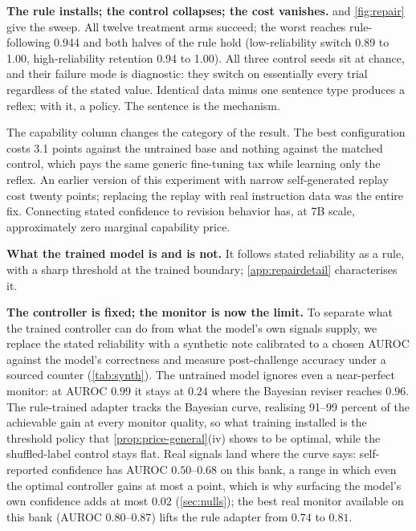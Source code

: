 \documentclass{article}
\begin{document}
\textbf{The rule installs; the control collapses; the cost vanishes.}  and \cref{fig:repair} give the sweep. All twelve treatment arms succeed; the worst reaches rule-following 0.944 and both halves of the rule hold (low-reliability switch 0.89 to 1.00, high-reliability retention 0.94 to 1.00). All three control seeds sit at chance, and their failure mode is diagnostic: they switch on essentially every trial regardless of the stated value. Identical data minus one sentence type produces a reflex; with it, a policy. The sentence is the mechanism.

The capability column changes the category of the result. The best configuration costs 3.1 points against the untrained base and nothing against the matched control, which pays the same generic fine-tuning tax while learning only the reflex. An earlier version of this experiment with narrow self-generated replay cost twenty points; replacing the replay with real instruction data was the entire fix. Connecting stated confidence to revision behavior has, at 7B scale, approximately zero marginal capability price.

\textbf{What the trained model is and is not.} It follows stated reliability as a rule, with a sharp threshold at the trained boundary; \cref{app:repairdetail} characterises it.




\textbf{The controller is fixed; the monitor is now the limit.} To separate what the trained controller can do from what the model's own signals supply, we replace the stated reliability with a synthetic note calibrated to a chosen AUROC against the model's correctness and measure post-challenge accuracy under a sourced counter (\cref{tab:synth}). The untrained model ignores even a near-perfect monitor: at AUROC $0.99$ it stays at $0.24$ where the Bayesian reviser reaches $0.96$. The rule-trained adapter tracks the Bayesian curve, realising 91--99 percent of the achievable gain at every monitor quality, so what training installed is the threshold policy that \cref{prop:price-general}(iv) shows to be optimal, while the shuffled-label control stays flat. Real signals land where the curve says: self-reported confidence has AUROC $0.50$--$0.68$ on this bank, a range in which even the optimal controller gains at most a point, which is why surfacing the model's own confidence adds at most $0.02$ (\cref{sec:nulls}); the best real monitor available on this bank (AUROC $0.80$--$0.87$) lifts the rule adapter from $0.74$ to $0.81$.
\end{document}
